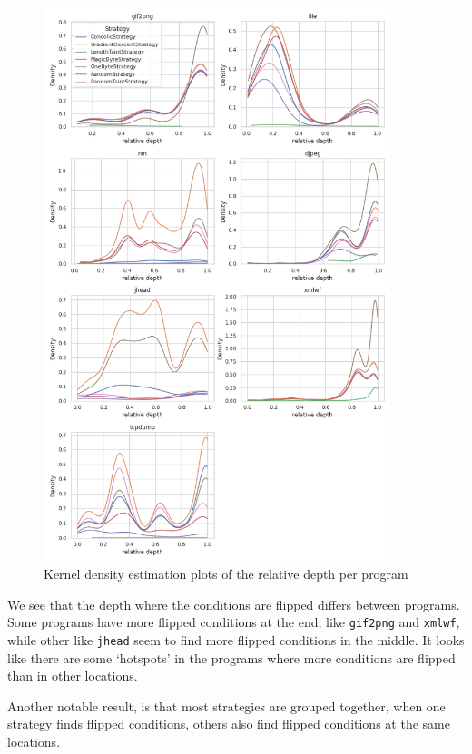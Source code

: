 \begin{figure}[p]
    \centering
    \includegraphics[width=0.9\textwidth]{5_results/graphs_new/kde_relative.png}  
    \caption{Kernel density estimation plots of the relative depth per program}
    \label{fig:kde-relative}
\end{figure}
We see that the depth where the conditions are flipped differs between programs. Some programs have more flipped conditions at the end, like \texttt{gif2png} and \texttt{xmlwf}, while other like \texttt{jhead} seem to find more flipped conditions in the middle. It looks like there are some `hotspots' in the programs where more conditions are flipped than in other locations. 

Another notable result, is that most strategies are grouped together, when one strategy finds flipped conditions, others also find flipped conditions at the same locations.

